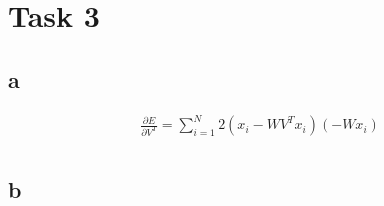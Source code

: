 \section*{Task 3}

\subsection*{a}

\begin{gather*}
\frac{\partial E}{\partial V^T} = \sum^N_{i=1} 2(x_i - W V^T x_i) (-W x_i) \\
\end{gather*}

\subsection*{b}


